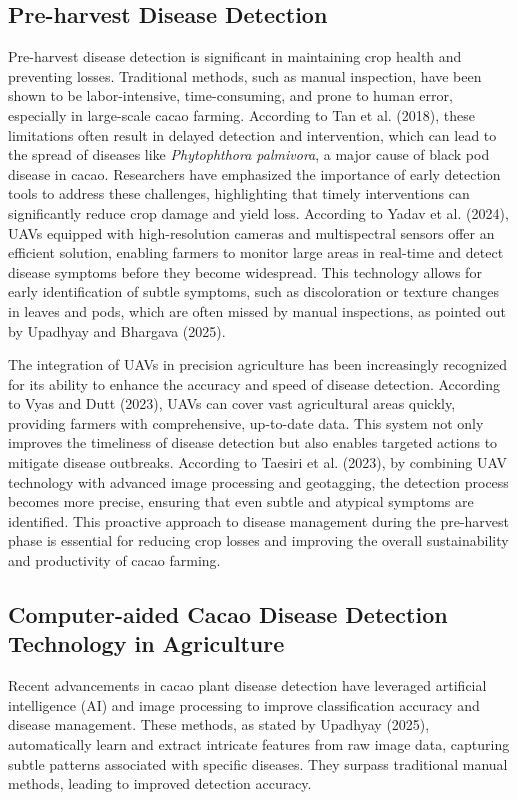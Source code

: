 \subsection{Pre-harvest Disease Detection}
Pre-harvest disease detection is significant in maintaining crop health and preventing losses. Traditional methods, such as manual inspection, have been shown to be labor-intensive, time-consuming, and prone to human error, especially in large-scale cacao farming. According to Tan et al. (2018), these limitations often result in delayed detection and intervention, which can lead to the spread of diseases like \textit{Phytophthora palmivora}, a major cause of black pod disease in cacao. Researchers have emphasized the importance of early detection tools to address these challenges, highlighting that timely interventions can significantly reduce crop damage and yield loss. According to Yadav et al. (2024), UAVs equipped with high-resolution cameras and multispectral sensors offer an efficient solution, enabling farmers to monitor large areas in real-time and detect disease symptoms before they become widespread. This technology allows for early identification of subtle symptoms, such as discoloration or texture changes in leaves and pods, which are often missed by manual inspections, as pointed out by Upadhyay and Bhargava (2025).

The integration of UAVs in precision agriculture has been increasingly recognized for its ability to enhance the accuracy and speed of disease detection. According to Vyas and Dutt (2023), UAVs can cover vast agricultural areas quickly, providing farmers with comprehensive, up-to-date data. This system not only improves the timeliness of disease detection but also enables targeted actions to mitigate disease outbreaks. According to Taesiri et al. (2023), by combining UAV technology with advanced image processing and geotagging, the detection process becomes more precise, ensuring that even subtle and atypical symptoms are identified. This proactive approach to disease management during the pre-harvest phase is essential for reducing crop losses and improving the overall sustainability and productivity of cacao farming.

\subsection{Computer-aided Cacao Disease Detection Technology in Agriculture}
Recent advancements in cacao plant disease detection have leveraged artificial intelligence (AI) and image processing to improve classification accuracy and disease management. These methods, as stated by Upadhyay (2025), automatically learn and extract intricate features from raw image data, capturing subtle patterns associated with specific diseases. They surpass traditional manual methods, leading to improved detection accuracy.

